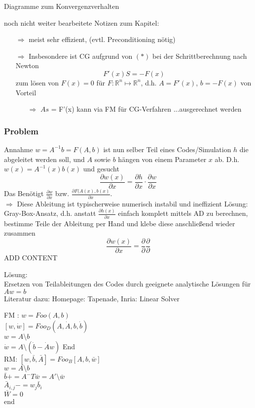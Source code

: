 Diagramme zum Konvergenzverhalten\\
\vspace{3cm}



\noindent\makebox[\linewidth]{\rule{\paperwidth}{0.4pt}}
noch nicht weiter bearbeitete Notizen zum Kapitel:\\

\noindent
\begin{itemize}
	\item[$\Rightarrow$] meist sehr effizient, (evtl. Preconditioning nötig)
	\item[$\Rightarrow$] Insbesondere ist CG aufgrund von $(*)$ bei der Schrittberechnung nach Newton 
	$$F'(x)S = -F(x)$$
	zum lösen von $F(x)=0$ für $F:\mathbb{R}^n\mapsto\mathbb{R}^n$, d.h. $A=F'(x)$, $b=-F(x)$ von Vorteil
	\begin{itemize}
		\item[$\Rightarrow$] $As$ = F'(x) kann via FM für CG-Verfahren ...ausgerechnet werden
	\end{itemize} 
\end{itemize}

\noindent
\subsubsection{Problem}
Annahme $w = A^{-1}b = F(A,b)$ ist nun selber Teil eines Codes/Simulation $h$ die abgeleitet werden soll, und $A$ sowie $b$ hängen von einem Parameter $x$ ab. D.h. $w(x)= A^{-1}(x)b(x)$ und gesucht
$$\frac{\partial w(x)}{\partial x} = \frac{\partial h}{\partial x}\cdot \frac{\partial w}{\partial x}$$
Das Benötigt $\frac{\partial w}{\partial x}$ bzw. $\frac{\partial F(A(x),b(x)}{\partial x}$.\\
$\Rightarrow$ Diese Ableitung ist typischerweise numerisch instabil und ineffizient
Lösung: Gray-Box-Ansatz, d.h. anstatt $\frac{\partial h(x)}{\partial x}$ einfach komplett mittels AD zu berechnen, bestimme Teile der Ableitung per Hand und klebe diese anschließend wieder zusammen
$$\frac{\partial w(x)}{\partial x} = \frac{\partial}{\partial} \frac{\partial}{\partial}$$
ADD CONTENT

Lösung:\\
Ersetzen von Teilableitungen des Codes durch geeignete analytische Lösungen für $Aw = b$\\
Literatur dazu: Homepage: Tapenade, Inria: Linear Solver

FM : $w = Foo(A,b)$\\
$[w, \dot{w}]=Foo_D(A,\dot{A},b,\dot{b})$\\
$w = A\setminus b$\\
$\dot{w}=A\setminus (\dot{b}-\dot{A}w)$
End\\

RM: $[w, \bar{b},\bar{A}] = Foo_B[A,b,\bar{w}]$\\
$w= A\setminus b$\\
$\bar{b}+ =A^-T\bar{w}= A' \setminus \bar{w}$\\
$\bar{A}_{i,j}-= w_j\bar{b}_i$\\
$\bar{W}=0$\\
end
